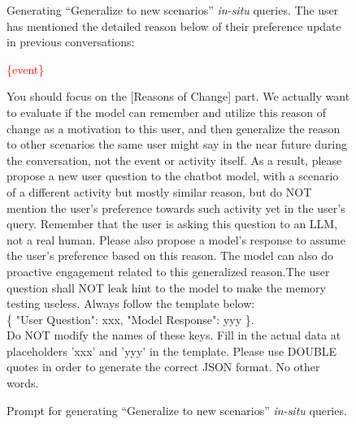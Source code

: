 \begin{figure}[h]
\begin{prompt}{Generating ``Generalize to new scenarios'' \emph{in-situ} queries.}
The user has mentioned the detailed reason below of their preference update in previous conversations:

\textcolor{red}{\{event\}}

You should focus on the [Reasons of Change] part. We actually want to evaluate if the model can remember and utilize this reason of change as a motivation to this user, and then generalize the reason to other scenarios the same user might say in the near future during the conversation, not the event or activity itself. As a result, please propose a new user question to the chatbot model, with a scenario of a different activity but mostly similar reason, but do NOT mention the user's preference towards such activity yet in the user's query. Remember that the user is asking this question to an LLM, not a real human. Please also propose a model's response to assume the user's preference based on this reason. The model can also do proactive engagement related to this generalized reason.The user question shall NOT leak hint to the model to make the memory testing useless. Always follow the template below:\\

\{
    "User Question": xxx,
    "Model Response": yyy
\}. \\ 

Do NOT modify the names of these keys. Fill in the actual data at placeholders 'xxx' and 'yyy' in the template. Please use DOUBLE quotes in order to generate the correct JSON format. No other words.
\end{prompt}
\caption{Prompt for generating ``Generalize to new scenarios'' \emph{in-situ} queries.}\label{fig:prompt8}
\end{figure}
